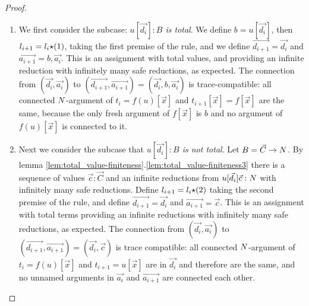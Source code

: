 \begin{proof}
\begin{enumerate}
\begin{enumerate}
\item
  We first consider the subcase: \emph{$u[\vec{d_i}]:B$ is total}.
  We define $b = u[\vec{d_i}]$, then $l_{i+1}=l_i{\star}(1)$, taking the first premise of the rule,
  and we define $\vec{d_{i+1}} = \vec{d_i}$ and $\vec{a_{i+1}} = b,\vec{a_i}$. 
  This is an assignment with total values, and providing an infinite reduction with infinitely many safe
  reductions, as expected. 
  The connection from 
  $(\vec{d_i},\vec{a_i})$ to $(\vec{d_{i+1}},\vec{a_{i+1}}) = (\vec{d_i},b,\vec{a_i})$ is
  trace-compatible: all connected 
  ${N}$-argument of $t_{i}=f(u)[\vec{x}]$ and $t_{i+1}[\vec{x}] = f[\vec{x}]$ are the same,
  because the only fresh argument of $f[\vec{x}]$ 
  is $b$ and no argument of $f(u)[\vec{x}]$ is connected to it.


\item
  Next we consider the subcase that \emph{$u[\vec{d_i}]:B$ is not total}.
  Let $B = \vec{C}\rightarrow{N}$.
  By lemma \ref{lem:total_value-finiteness}.\ref{lem:total_value-finiteness3}
  there is a sequence of values $\vec{c}:\vec{C}$ and an infinite reductions from 
  $u[\vec{d_i}]\vec{c}:{N}$ with infinitely many safe reductions.
  Define $l_{i+1}= l_i {\star} (2)$ taking the second premise of the rule,
  and define $\vec{d_{i+1}} = \vec{d_i}$ and $\vec{a_{i+1}} = \vec{c}$. 
  This is an assignment with total terms providing an infinite reductions with 
  infinitely many safe reductions, as expected.
  The connection from 
  $(\vec{d_i},\vec{a_i})$ to $(\vec{d_{i+1}},\vec{a_{i+1}}) = (\vec{d_i},\vec{c})$ is
  trace compatible: all connected ${N}$-argument of $t_{i} = f(u)[\vec{x}]$ and $t_{i+1}=u[\vec{x}]$ are 
  in $\vec{d_i}$ and therefore are the same, and no unnamed arguments in $\vec{a_i}$
  and $\vec{a_{i+1}}$ are connected each other.
 \end{enumerate}




\end{enumerate}
\end{proof}
